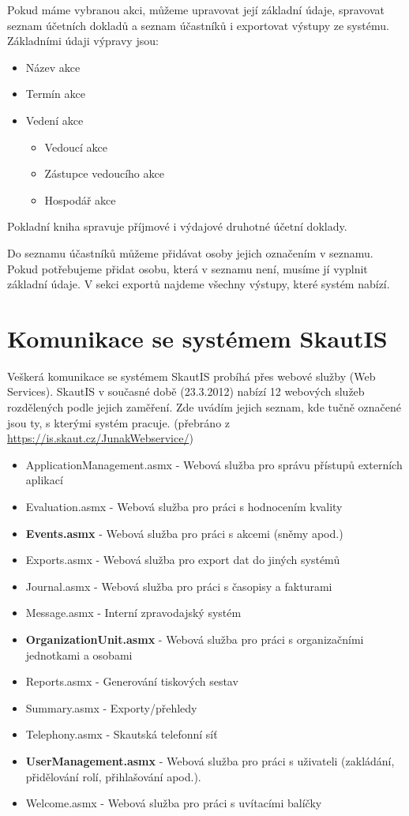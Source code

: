\documentclass[thesis=B,czech]{FITthesis}[2011/06/14]
\begin{document}
Pokud máme vybranou akci, můžeme upravovat její základní údaje, spravovat seznam účetních dokladů a seznam účastníků i exportovat výstupy ze systému. Základními údaji výpravy jsou:
\begin{itemize}
	\item Název akce
	\item Termín akce
	\item Vedení akce
	\begin{itemize}
		\item Vedoucí akce
		\item Zástupce vedoucího akce
		\item Hospodář akce
	\end{itemize}
\end{itemize}

Pokladní kniha spravuje příjmové i výdajové druhotné účetní doklady. 

Do seznamu účastníků můžeme přidávat osoby jejich označením v seznamu. Pokud potřebujeme přidat osobu, která v seznamu není, musíme jí vyplnit základní údaje. V sekci exportů najdeme všechny výstupy, které systém nabízí.

\section{Komunikace se systémem SkautIS}
Veškerá komunikace se systémem SkautIS probíhá přes webové služby (Web Services). SkautIS v současné době (23.3.2012) nabízí 12 webových služeb rozdělených podle jejich zaměření. Zde uvádím jejich seznam, kde tučně označené jsou ty, s kterými systém pracuje. (přebráno z \url{https://is.skaut.cz/JunakWebservice/})
\begin{itemize}
	\item ApplicationManagement.asmx - Webová služba pro správu přístupů externích aplikací
	\item Evaluation.asmx - Webová služba pro práci s hodnocením kvality
	\item \textbf{Events.asmx} - Webová služba pro práci s akcemi (sněmy apod.)
	\item Exports.asmx - Webová služba pro export dat do jiných systémů
	\item Journal.asmx - Webová služba pro práci s časopisy a fakturami
	\item Message.asmx - Interní zpravodajský systém
	\item \textbf{OrganizationUnit.asmx} - Webová služba pro práci s organizačními jednotkami a osobami
	\item Reports.asmx - Generování tiskových sestav
	\item Summary.asmx - Exporty/přehledy
	\item Telephony.asmx - Skautská telefonní síť
	\item \textbf{UserManagement.asmx} - Webová služba pro práci s uživateli (zakládání, přidělování rolí, přihlašování apod.).
	\item Welcome.asmx - Webová služba pro práci s uvítacími balíčky
\end{itemize}
\end{document}
